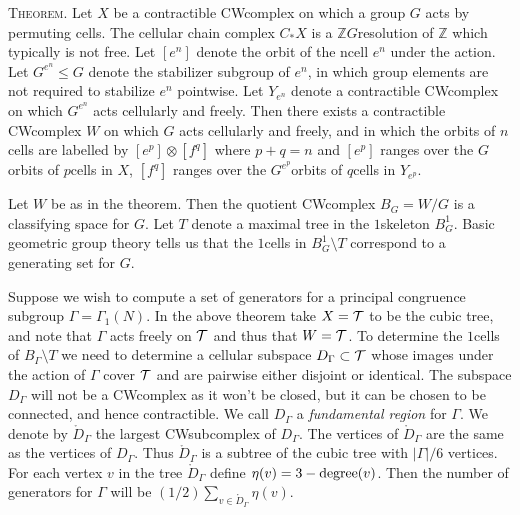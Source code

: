 \documentclass[a4paper,11pt]{report}
\begin{document}
{{\textsc{Theorem.} Let $X$ be a contractible CW\texttt{}complex on which a group $G$ acts by permuting cells. The cellular chain complex $C_\ast X$ is a $\mathbb ZG$\texttt{}resolution of $\mathbb Z$ which typically is not free. Let $[e^n]$ denote the orbit of the n\texttt{}cell $e^n$ under the action. Let $G^{e^n} \le G$ denote the stabilizer subgroup of $e^n$, in which group elements are not required to stabilize $e^n$ point\texttt{}wise. Let $Y_{e^n}$ denote a contractible CW\texttt{}complex on which $G^{e^n}$ acts cellularly and freely. Then there exists a contractible
CW\texttt{}complex $W$ on which $G$ acts cellularly and freely, and in which the orbits of $n$\texttt{}cells are labelled by $[e^p]\otimes [f^q]$ where $p+q=n$ and $[e^p]$ ranges over the $G$\texttt{}orbits of $p$\texttt{}cells in $X$, $[f^q]$ ranges over the $G^{e^p}$\texttt{}orbits of $q$\texttt{}cells in $Y_{e^p}$. 

 

Let $W$ be as in the theorem. Then the quotient CW\texttt{}complex $B_G=W/G$ is a classifying space for $G$. Let $T$ denote a maximal tree in the $1$\texttt{}skeleton $B^1_G$. Basic geometric group theory tells us that the $1$\texttt{}cells in $B^1_G\setminus T$ correspond to a generating set for $G$. 

 Suppose we wish to compute a set of generators for a principal congruence
subgroup $\Gamma=\Gamma_1(N)$. In the above theorem take $X={\cal T}$ to be the cubic tree, and note that $\Gamma$ acts freely on $\cal T$ and thus that $W={\cal T}$. To determine the $1$\texttt{}cells of $B_{\Gamma}\setminus T$ we need to determine a cellular subspace $D_\Gamma \subset \cal T$ whose images under the action of $\Gamma$ cover $\cal T$ and are pairwise either disjoint or identical. The subspace $D_\Gamma$ will not be a CW\texttt{}complex as it won't be closed, but it can
be chosen to be connected, and hence contractible. We call $D_\Gamma$ a \emph{fundamental region} for $\Gamma$. We denote by $\mathring D_\Gamma$ the largest CW\texttt{}subcomplex of $D_\Gamma$. The vertices of $\mathring D_\Gamma$ are the same as the vertices of $D_\Gamma$. Thus $\mathring D_\Gamma$ is a subtree of the cubic tree with $|\Gamma|/6$ vertices. For each vertex $v$ in the tree $\mathring D_\Gamma$ define $\eta(v)=3 -{\rm degree}(v)$. Then the number of generators for $ \Gamma $ will be $(1/2)\sum_{v\in \mathring D_\Gamma} \eta(v)$. 

}}
\end{document}
